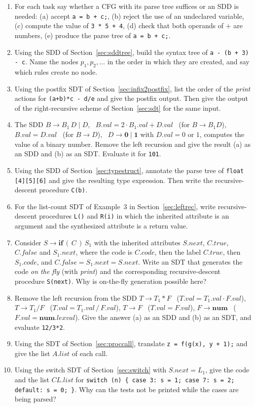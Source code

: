 \documentclass[11pt,a4paper]{article}
\newcommand{\at}[2]{\ensuremath{#1.\mathit{#2}}}
\begin{document}
\begin{enumerate}[label=\textbf{Q\arabic*.}]
\item For each task say whether a CFG with its parse tree suffices or an SDD is needed: (a) accept \texttt{a = b + c;}, (b) reject the use of an undeclared variable, (c) compute the value of \texttt{3 * 5 + 4}, (d) check that both operands of $+$ are numbers, (e) produce the parse tree of \texttt{a = b + c;}.
\item Using the SDD of Section~\ref{sec:sddtree}, build the syntax tree of \texttt{a - (b + 3) - c}. Name the nodes $p_1,p_2,\dots$ in the order in which they are created, and say which rules create no node.
\item Using the postfix SDT of Section~\ref{sec:infix2postfix}, list the order of the \textit{print} actions for \texttt{(a+b)*c - d/e} and give the postfix output. Then give the output of the right-recursive scheme of Section~\ref{sec:sdt} for the same input.
\item The SDD $B\to B_1\,D\mid D$, \ $\at{B}{val}=2\cdot\at{B_1}{val}+\at{D}{val}$ \ (for $B\to B_1D$), \ $\at{B}{val}=\at{D}{val}$ \ (for $B\to D$), \ $D\to\mathbf{0}\mid\mathbf{1}$ with $\at{D}{val}=0$ or $1$, computes the value of a binary number. Remove the left recursion and give the result (a) as an SDD and (b) as an SDT. Evaluate it for \texttt{101}.
\item Using the SDD of Section~\ref{sec:typestruct}, annotate the parse tree of \texttt{float [4][5][6]} and give the resulting type expression. Then write the recursive-descent procedure \texttt{C(b)}.
\item For the list-count SDT of Example~3 in Section~\ref{sec:leftrec}, write recursive-descent procedures \texttt{L()} and \texttt{R(i)} in which the inherited attribute is an argument and the synthesized attribute is a return value.
\item Consider $S\to\mathbf{if}\,(\,C\,)\,S_1$ with the inherited attributes $S.next$, $C.true$, $C.false$ and $S_1.next$, where the code is $C.code$, then the label $C.true$, then $S_1.code$, and $C.false=S_1.next=S.next$. Write an SDT that generates the code \emph{on the fly} (with \textit{print}) and the corresponding recursive-descent procedure \texttt{S(next)}. Why is on-the-fly generation possible here?
\item Remove the left recursion from the SDD $T\to T_1*F$ \ ($\at{T}{val}=\at{T_1}{val}\cdot\at{F}{val}$), $T\to T_1/F$ \ ($\at{T}{val}=\at{T_1}{val}\,/\,\at{F}{val}$), $T\to F$ \ ($\at{T}{val}=\at{F}{val}$), $F\to\mathbf{num}$ \ ($\at{F}{val}=\at{\mathbf{num}}{lexval}$). Give the answer (a) as an SDD and (b) as an SDT, and evaluate \texttt{12/3*2}.
\item Using the SDT of Section~\ref{sec:proccall}, translate \texttt{z = f(g(x), y + 1);} and give the list $A.\mathit{list}$ of each call.
\item Using the switch SDT of Section~\ref{sec:switch} with $\at{S}{next}=L_1$, give the code and the list $\mathit{CL}.\mathit{list}$ for \texttt{switch (n) \{ case 3: s = 1; case 7: s = 2; default: s = 0; \}}. Why can the tests not be printed while the cases are being parsed?
\end{enumerate}
\end{document}
